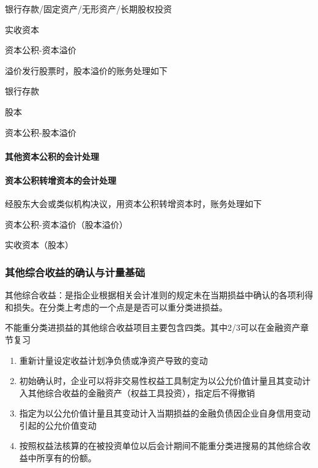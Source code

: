 \documentclass[UTF8,12pt]{ctexart}
\newenvironment{Dr}{%
	\begin{list}{}%
		{
			\setlength{\leftmargin}{2em}
			\setlength{\labelwidth}{2em}
			\setlength{\labelsep}{0pt}
			\setlength{\itemindent}{0pt}
			\setlength{\listparindent}{0pt}
			\setlength{\parsep}{0pt}
			\setlength{\topsep}{0pt}
		}
		\item[\textbf{借：}]
	}{%
	\end{list}
}
\newenvironment{Cr}{%
	\begin{list}{}%
		{
			\setlength{\leftmargin}{3em}
			\setlength{\labelwidth}{2em}
			\setlength{\labelsep}{0pt}
			\setlength{\itemindent}{0pt}
			\setlength{\listparindent}{0pt}
			\setlength{\parsep}{0pt}
			\setlength{\topsep}{0pt}
		}
		\item[\textbf{贷：}]
	}{%
	\end{list}
}
\numberwithin{equation}{section} %
\numberwithin{figure}{section}
\numberwithin{table}{section}
\begin{document}
	\begin{Dr}
		银行存款/固定资产/无形资产/长期股权投资
	\end{Dr}
	\begin{Cr}
		实收资本
		
		资本公积-资本溢价
	\end{Cr}
	
	溢价发行股票时，股本溢价的账务处理如下
	
	\begin{Dr}
		银行存款
	\end{Dr}
	\begin{Cr}
		股本
		
		资本公积-股本溢价
	\end{Cr}
	
	\paragraph{其他资本公积的会计处理}
	
	\paragraph{资本公积转增资本的会计处理}
	
	经股东大会或类似机构决议，用资本公积转增资本时，账务处理如下
	
	\begin{Dr}
		资本公积-资本溢价（股本溢价）
	\end{Dr}
	\begin{Cr}
		实收资本（股本）
	\end{Cr}
	
	\subsubsection{其他综合收益的确认与计量基础}
	其他综合收益：是指企业根据相关会计准则的规定未在当期损益中确认的各项利得和损失。在分类上考虑的一个点是是否可以重分类进损益。
	
	不能重分类进损益的其他综合收益项目主要包含四类。其中2/3可以在金融资产章节复习
	\begin{enumerate}
		\item 重新计量设定收益计划净负债或净资产导致的变动
		
		\item 初始确认时，企业可以将非交易性权益工具制定为以公允价值计量且其变动计入其他综合收益的金融资产（权益工具投资），指定后不得撤销
		
		\item 指定为以公允价值计量且其变动计入当期损益的金融负债因企业自身信用变动引起的公允价值变动
		
		\item 按照权益法核算的在被投资单位以后会计期间不能重分类进搜易的其他综合收益中所享有的份额。
	\end{enumerate}
	
\end{document}
